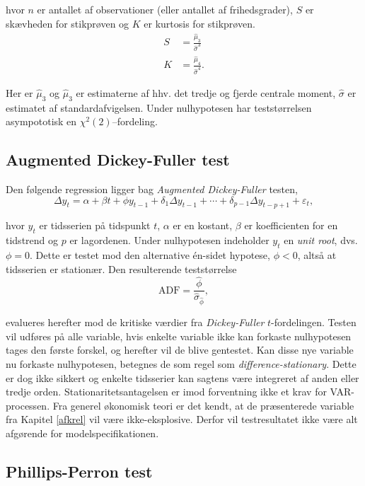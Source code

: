 \documentclass[
  a4paper,
  oneside]{memoir}
\begin{document}
hvor \(n\) er antallet af observationer (eller antallet af frihedsgrader), \(S\) er skævheden for stikprøven og \(K\) er kurtosis for stikprøven.
\begin{align*}
S&=\frac{\hat{\mu}_3}{\hat{\sigma}^3}\\
K&=\frac{\hat{\mu}_4}{\hat{\sigma}^4}.
\end{align*}

Her er \(\hat{\mu}_3\) og \(\hat{\mu}_3\) er estimaterne af hhv. det tredje og fjerde centrale moment, \(\hat{\sigma}\) er estimatet af standardafvigelsen. Under nulhypotesen har teststørrelsen asympototisk en \(\chi^2(2)\)--fordeling.

\hypertarget{augmented-dickey-fuller-test}{%
\subsection{Augmented Dickey-Fuller test}\label{augmented-dickey-fuller-test}}

Den følgende regression ligger bag \emph{Augmented Dickey-Fuller} testen, \citep{Dickey1979}
\[\Delta y_{t} = \alpha + \beta t + \phi y_{t-1} + \delta_1 \Delta y_{t-1} + \cdots + \delta_{p-1}\Delta y_{t-p+1} + \varepsilon_t,\]

hvor \(y_t\) er tidsserien på tidspunkt \(t\), \(\alpha\) er en kostant, \(\beta\) er koefficienten for en tidstrend og \(p\) er lagordenen. Under nulhypotesen indeholder \(y_t\) en \emph{unit root}, dvs. \(\phi=0\). Dette er testet mod den alternative én-sidet hypotese, \(\phi<0\), altså at tidsserien er stationær. Den resulterende teststørrelse
\[\text{ADF}=\frac{\hat{\phi}}{\hat{\sigma}_{\hat{\phi}}},\]

evalueres herefter mod de kritiske værdier fra \emph{Dickey-Fuller} \(t\)-fordelingen. Testen vil udføres på alle variable, hvis enkelte variable ikke kan forkaste nulhypotesen tages den første forskel, og herefter vil de blive gentestet. Kan disse nye variable nu forkaste nulhypotesen, betegnes de som regel som \emph{difference-stationary}. Dette er dog ikke sikkert og enkelte tidsserier kan sagtens være integreret af anden eller tredje orden. Stationaritetsantagelsen er imod forventning ikke et krav for VAR-processen. Fra generel økonomisk teori er det kendt, at de præsenterede variable fra Kapitel \ref{afkrel} vil være ikke-eksplosive. Derfor vil testresultatet ikke være alt afgørende for modelspecifikationen.

\hypertarget{phillips-perron-test}{%
\subsection{Phillips-Perron test}\label{phillips-perron-test}}
\end{document}
